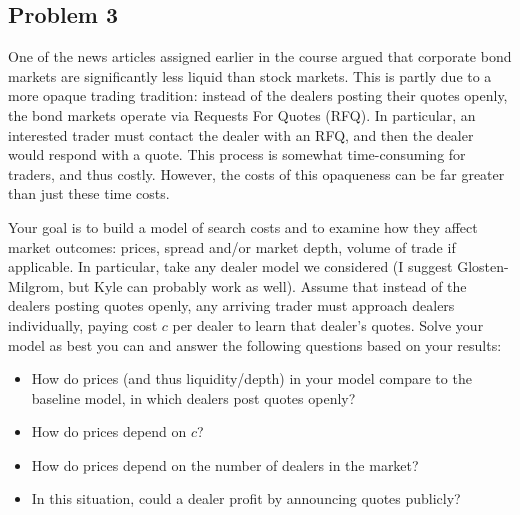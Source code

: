 \documentclass[11pt
, answers
]{exam}
\begin{document}
\qquad
\subsection*{Problem 3}

One of the news articles assigned earlier in the course argued that corporate bond markets are significantly less liquid than stock markets. This is partly due to a more opaque trading tradition: instead of the dealers posting their quotes openly, the bond markets operate via Requests For Quotes (RFQ). In particular, an interested trader must contact the dealer with an RFQ, and then the dealer would respond with a quote. This process is somewhat time-consuming for traders, and thus costly. However, the costs of this opaqueness can be far greater than just these time costs.

Your goal is to build a model of search costs and to examine how they affect market outcomes: prices, spread and/or market depth, volume of trade if applicable. In particular, take any dealer model we considered (I suggest Glosten-Milgrom, but Kyle can probably work as well). Assume that instead of the dealers posting quotes openly, any arriving trader must approach dealers individually, paying cost $c$ per dealer to learn that dealer's quotes. Solve your model as best you can and answer the following questions based on your results:
\begin{itemize}
	\item How do prices (and thus liquidity/depth) in your model compare to the baseline model, in which dealers post quotes openly?
	\item How do prices depend on $c$? 
	\item How do prices depend on the number of dealers in the market?
	\item In this situation, could a dealer profit by announcing quotes publicly?
\end{itemize}
\end{document}
